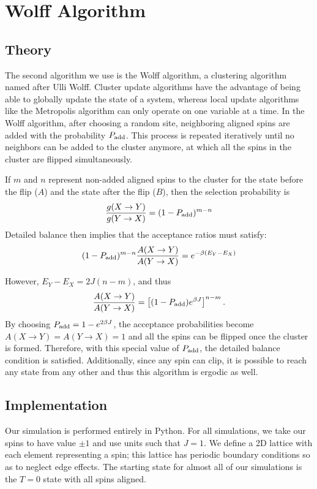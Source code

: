 \documentclass[twocolumn,aps,prl]{revtex4-1} %
\begin{document}
\section{Wolff Algorithm}
\subsection{Theory}
The second algorithm we use is the Wolff algorithm, a clustering algorithm named after Ulli Wolff. Cluster update algorithms have the advantage of being able to globally update the state of a system, whereas local update algorithms like the Metropolis algorithm can only operate on one variable at a time. In the Wolff algorithm, after choosing a random site, neighboring aligned spins are added with the probability $P_{\rm add}$. This process is repeated iteratively until no neighbors can be added to the cluster anymore, at which all the spins in the cluster are flipped simultaneously. 

If $m$ and $n$ represent non-added aligned spins to the cluster for the state before the flip ($A$) and the state after the flip ($B$), then the selection probability is 
\begin{equation}
	\frac{g(X \to Y)}{g(Y \to X)} = (1-P_{\rm add})^{m-n}
\end{equation}
Detailed balance then implies that the acceptance ratios must satisfy:
\begin{equation}
	(1-P_{\rm add})^{m-n} \frac{A(X \to Y)}{A(Y \to X)} = e^{-\beta(E_Y - E_X)}
\end{equation}

However, $E_Y - E_X = 2J(n-m)$, and thus
\begin{equation}
	\frac{A(X \to Y)}{A(Y \to X)} = \left[ (1-P_{\rm add})e^{\beta J} \right]^{n-m}.
\end{equation}
By choosing $P_{\rm add} = 1-e^{2 \beta J}$, the acceptance probabilities become $A(X \to Y) = A(Y \to X) = 1$ and all the spins can be flipped once the cluster is formed. Therefore, with this special value of $P_{\rm add}$, the detailed balance condition is satisfied. Additionally, since any spin can clip, it is possible to reach any state from any other and thus this algorithm is ergodic as well. 

\subsection{Implementation}
Our simulation is performed entirely in Python. For all simulations, we take our spins to have value $\pm 1$ and use units such that $J = 1$. We define a 2D lattice with each element representing a spin; this lattice has periodic boundary conditions so as to neglect edge effects. The starting state for almost all of our simulations is the $T = 0$ state with all spins aligned.
\end{document}
